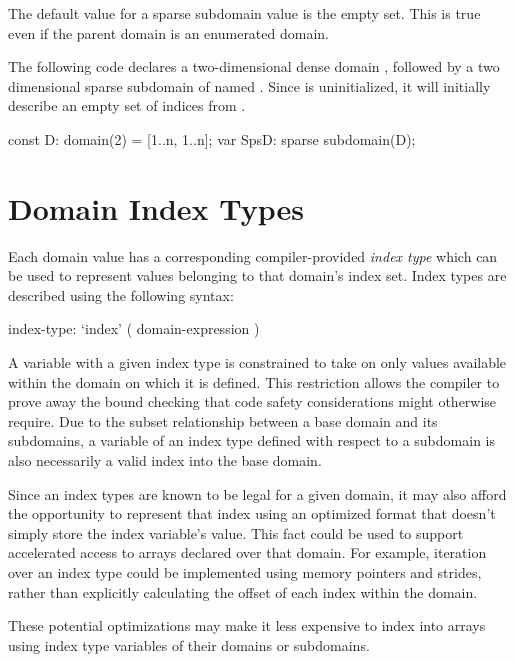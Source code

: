 The default value for a sparse subdomain value is the empty set.  This is true
even if the parent domain is an enumerated domain.

\begin{example}
The following code declares a two-dimensional dense domain ,
followed by a two dimensional sparse subdomain of 
named .  Since  is uninitialized, it will
initially describe an empty set of indices from .
\begin{chapel}
const D: domain(2) = [1..n, 1..n];
var SpsD: sparse subdomain(D);
\end{chapel}
\end{example}

\section{Domain Index Types}
\label{Index_Types}

Each domain value has a corresponding compiler-provided \emph{index
type} which can be used to represent values belonging to that domain's
index set.  Index types are described using the following syntax:

\begin{syntax}
index-type:
  `index' ( domain-expression )
\end{syntax}

A variable with a given index type is constrained to take on only values
available within the domain on which it is defined.  This restriction allows the
compiler to prove away the bound checking that code safety considerations might
otherwise require.  Due to the subset relationship between a base domain and its
subdomains, a variable of an index type defined with respect to a subdomain is
also necessarily a valid index into the base domain.

Since an index types are known to be legal for a given domain, it may
also afford the opportunity to represent that index using an optimized
format that doesn't simply store the index variable's value.  This fact could be
used to support accelerated access to arrays declared over that domain.  For
example, iteration over an index type could be implemented using memory pointers
and strides, rather than explicitly calculating the offset of each index
within the domain.

These potential optimizations may make it less expensive to
index into arrays using index type variables of their domains or
subdomains.

